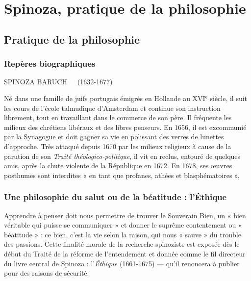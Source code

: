 
\chapter{Spinoza, pratique de la philosophie}

\section{Pratique de la philosophie}

\subsection{Repères biographiques}

SPINOZA BARUCH\ \ \ (1632-1677)

\vspace{0.25cm}
Né dans une famille de juifs portugais émigrés en Hollande au {\footnotesize XVI}$^\text{e}$
siècle, il suit les cours de l’école talmudique d'Amsterdam et continue
son instruction librement, tout en travaillant dans le commerce de son
père. Il fréquente les milieux des
chrétiens libéraux et des libres penseurs. En 1656, il est excommunié
par la Synagogue et doit gagner sa
vie en polissant des verres de
lunettes d'approche. Très attaqué
depuis 1670 par les milieux religieux
à cause de la parution de son {\it Traité
théologico-politique}, il vit en reclus,
entouré de quelques amis, après la
chute violente de la République en
1672. En 1678, ses œuvres posthumes sont interdites « en tant que
profanes, athées et  blasphématoires »,

\subsection{Une philosophie du salut ou de la béatitude : l’Éthique}

Apprendre à penser doit nous permettre
de trouver le Souverain Bien, un « bien
véritable qui puisse se communiquer » et
donner le suprême contentement ou
« béatitude » : ce bien, c’est la vie selon
la raison, qui nous « sauve » du trouble
des passions. Cette finalité morale de la
recherche spinoziste est exposée dès le
début du Traité de la réforme de l'entendement et donnée comme le fil directeur
du livre central de Spinoza : l'{\it Éthique}
(1661-1675) — qu'il renoncera à publier
pour des raisons de sécurité.


